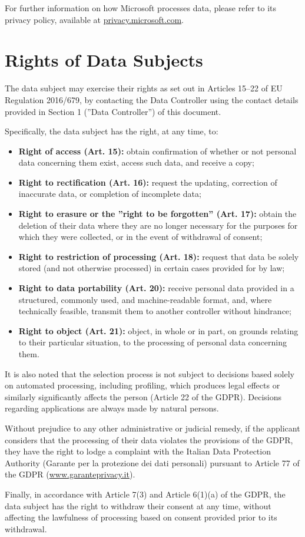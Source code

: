 \documentclass[legal]{polinetwork}
\begin{document}
For further information on how Microsoft processes data, please refer to its privacy policy, available at \href{https://privacy.microsoft.com}{privacy.microsoft.com}.

\section{Rights of Data Subjects}

The data subject may exercise their rights as set out in Articles 15–22 of EU Regulation 2016/679, by contacting the Data Controller using the contact details provided in Section 1 (”Data Controller”) of this document.

Specifically, the data subject has the right, at any time, to:
\begin{itemize}
	\item \textbf{Right of access (Art. 15):} obtain confirmation of whether or not personal data concerning them exist, access such data, and receive a copy;
	\item \textbf{Right to rectification (Art. 16):} request the updating, correction of inaccurate data, or completion of incomplete data;
	\item \textbf{Right to erasure or the ”right to be forgotten” (Art. 17):} obtain the deletion of their data where they are no longer necessary for the purposes for which they were collected, or in the event of withdrawal of consent;
	\item \textbf{Right to restriction of processing (Art. 18):} request that data be solely stored (and not otherwise processed) in certain cases provided for by law;
	\item \textbf{Right to data portability (Art. 20):} receive personal data provided in a structured, commonly used, and machine-readable format, and, where technically feasible, transmit them to another controller without hindrance;
	\item \textbf{Right to object (Art. 21):} object, in whole or in part, on grounds relating to their particular situation, to the processing of personal data concerning them.
\end{itemize}

It is also noted that the selection process is not subject to decisions based solely on automated processing, including profiling, which produces legal effects or similarly significantly affects the person (Article 22 of the GDPR). Decisions regarding applications are always made by natural persons.

Without prejudice to any other administrative or judicial remedy, if the applicant considers that the processing of their data violates the provisions of the GDPR, they have the right to lodge a complaint with the Italian Data Protection Authority (Garante per la protezione dei dati personali) pursuant to Article 77 of the GDPR (\href{https://www.garanteprivacy.it}{www.garanteprivacy.it}).

Finally, in accordance with Article 7(3) and Article 6(1)(a) of the GDPR, the data subject has the right to withdraw their consent at any time, without affecting the lawfulness of processing based on consent provided prior to its withdrawal.
\end{document}
